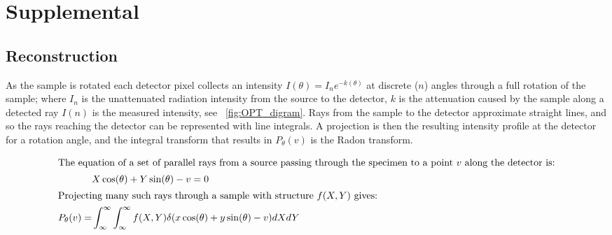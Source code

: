 \documentclass{osa-article}
\begin{document}
%
%
%
%
\section{Supplemental}
\subsection{Reconstruction}

As the sample is rotated each detector pixel collects an intensity \(I(\theta) = I_{n}e^{-k(\theta)}\) at discrete (\(n\)) angles through a full rotation of the sample; where \(I_{n}\) is the unattenuated radiation intensity from the source to the detector, \(k\) is the attenuation caused by the sample along a detected ray \(I(n)\) is the measured intensity, see \figurename~\ref{fig:OPT_digram}.
Rays from the sample to the detector approximate straight lines, and so the rays reaching the detector can be represented with line integrals.
A projection is then the resulting intensity profile at the detector for a rotation angle, and the integral transform that results in \(P_\theta(v)\)
is the Radon transform.

\begin{align}
  \intertext{The equation of a set of parallel rays from a source passing through the specimen to a point \(v\) along the detector is:}
                & X\cos(\theta) + Y\sin(\theta) - v = 0                                                            \\
  \intertext{Projecting many such rays through a sample with structure \(f(X,Y)\) gives:}
  P_\theta(v) = & \int_{\infty}^{\infty} \int_{\infty}^{\infty} f(X,Y)\delta (x\cos(\theta)+y \sin(\theta)-v)dX dY
\end{align}
\end{document}
